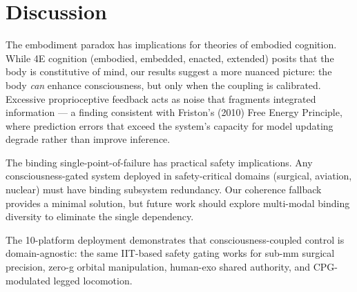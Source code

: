 \documentclass[11pt,a4paper]{article}
\begin{document}
\section{Discussion}

The embodiment paradox has implications for theories of embodied cognition.
While 4E cognition (embodied, embedded, enacted, extended) posits that the
body is constitutive of mind, our results suggest a more nuanced picture:
the body \emph{can} enhance consciousness, but only when the coupling is
calibrated. Excessive proprioceptive feedback acts as noise that fragments
integrated information --- a finding consistent with Friston's (2010) Free
Energy Principle, where prediction errors that exceed the system's capacity
for model updating degrade rather than improve inference.

The binding single-point-of-failure has practical safety implications.
Any consciousness-gated system deployed in safety-critical domains (surgical,
aviation, nuclear) must have binding subsystem redundancy. Our coherence
fallback provides a minimal solution, but future work should explore
multi-modal binding diversity to eliminate the single dependency.

The 10-platform deployment demonstrates that consciousness-coupled control
is domain-agnostic: the same IIT-based safety gating works for sub-mm
surgical precision, zero-g orbital manipulation, human-exo shared authority,
and CPG-modulated legged locomotion.
\end{document}
